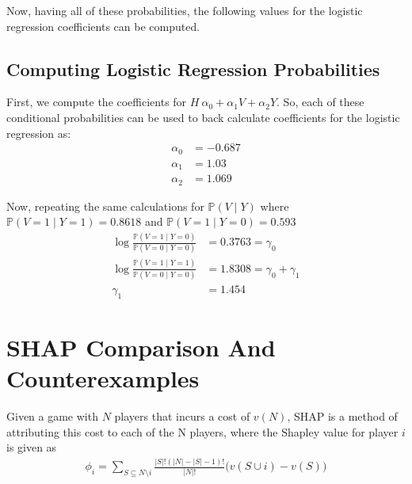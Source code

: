 \documentclass{article}
\begin{document}
Now, having all of these probabilities, the following values for the logistic regression coefficients can be computed.

\subsection{Computing Logistic Regression Probabilities}
First, we compute the coefficients for $H ~ \alpha_0 + \alpha_1V + \alpha_2Y$. So, each of these conditional probabilities can be used to back calculate coefficients for the logistic regression as:
\begin{align*}
\alpha_0 &= -0.687\\
\alpha_1 &= 1.03\\
\alpha_2 &= 1.069
\end{align*}


Now, repeating the same calculations for $\mathbb{P}(V \mid Y)$ where $\mathbb{P}(V = 1 \mid Y = 1) = 0.8618$ and $\mathbb{P}(V = 1 \mid Y = 0) = 0.593$
\begin{align*}
\log{\frac{\mathbb{P}(V = 1 \mid Y = 0)}{\mathbb{P}(V = 0 \mid Y = 0)}} &= 0.3763 = \gamma_0\\
\log{\frac{\mathbb{P}(V = 1 \mid Y = 1)}{\mathbb{P}(V = 0 \mid Y = 0)}} &= 1.8308 = \gamma_0 + \gamma_1\\
\gamma_1 &= 1.454
\end{align*}

\section{SHAP Comparison And Counterexamples}

Given a game with $N$ players that incurs a cost of $v(N)$, SHAP is a method of attributing this cost to each of the N players, where the Shapley value for player $i$ is given as
\begin{align*}
\phi_i = \sum_{S \subseteq N \setminus i} \frac{|S|!(|N| - |S| - 1)!}{|N|!}\Big(v(S \cup i) - v(S) \Big)
\end{align*}
\end{document}
